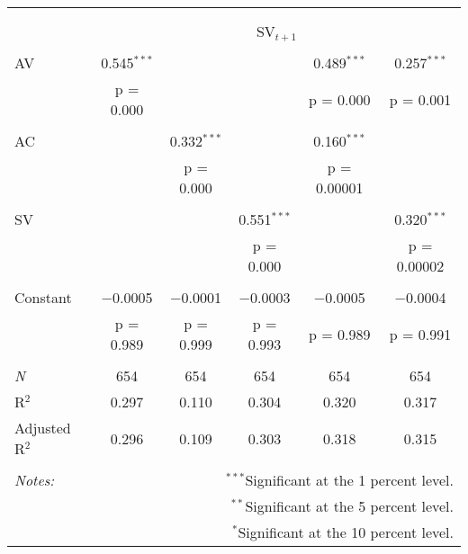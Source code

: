 
\begin{tabular}{@{\extracolsep{5pt}}lccccc} 
\\[-1.8ex]\hline 
\hline \\[-1.8ex] 
\\[-1.8ex] & \multicolumn{5}{c}{SV$_{t+1}$} \\ 
\hline \\[-1.8ex] 
 AV & 0.545$^{***}$ &  &  & 0.489$^{***}$ & 0.257$^{***}$ \\ 
  & p = 0.000 &  &  & p = 0.000 & p = 0.001 \\ 
  & & & & & \\ 
 AC &  & 0.332$^{***}$ &  & 0.160$^{***}$ &  \\ 
  &  & p = 0.000 &  & p = 0.00001 &  \\ 
  & & & & & \\ 
 SV &  &  & 0.551$^{***}$ &  & 0.320$^{***}$ \\ 
  &  &  & p = 0.000 &  & p = 0.00002 \\ 
  & & & & & \\ 
 Constant & $-$0.0005 & $-$0.0001 & $-$0.0003 & $-$0.0005 & $-$0.0004 \\ 
  & p = 0.989 & p = 0.999 & p = 0.993 & p = 0.989 & p = 0.991 \\ 
  & & & & & \\ 
\textit{N} & 654 & 654 & 654 & 654 & 654 \\ 
R$^{2}$ & 0.297 & 0.110 & 0.304 & 0.320 & 0.317 \\ 
Adjusted R$^{2}$ & 0.296 & 0.109 & 0.303 & 0.318 & 0.315 \\ 
\hline 
\hline \\[-1.8ex] 
\textit{Notes:} & \multicolumn{5}{r}{$^{***}$Significant at the 1 percent level.} \\ 
 & \multicolumn{5}{r}{$^{**}$Significant at the 5 percent level.} \\ 
 & \multicolumn{5}{r}{$^{*}$Significant at the 10 percent level.} \\ 
\end{tabular} 
